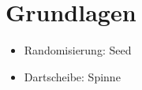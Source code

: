 
\chapter{Grundlagen}
\label{cha:basics}

\begin{itemize}
    \item Randomisierung: Seed
    \item Dartscheibe: Spinne
\end{itemize}